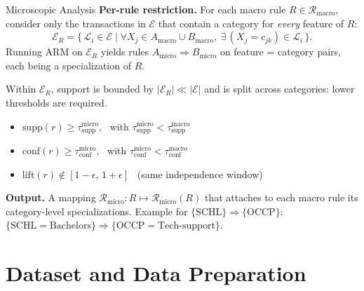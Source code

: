 \documentclass[10pt,aspectratio=169]{beamer}
\begin{document}
\begin{frame}{Microscopic Analysis}
  \textbf{Per-rule restriction.} For each macro rule $R \in \mathcal{R}_{\mathrm{macro}}$, consider only the transactions in $\mathcal{E}$ that contain a category for \emph{every} feature of $R$:
  \begin{equation*}
    \mathcal{E}_R = \{\, \mathcal{L}_i \in \mathcal{E} \mid \forall X_j \in A_{\mathrm{macro}} \cup B_{\mathrm{macro}},\ \exists\, (X_j = c_{jk}) \in \mathcal{L}_i \,\}.
  \end{equation*}
  Running ARM on $\mathcal{E}_R$ yields rules $A_{\mathrm{micro}} \Rightarrow B_{\mathrm{micro}}$ on \textcolor{highlightorange}{feature = category pairs}, each being a specialization of $R$.
  \vspace{4pt}
  
  \begin{tcolorbox}[colback=parthenopeaccent!25,colframe=parthenopenavy,boxrule=0.5pt,arc=1pt,title=\bfseries Filtering thresholds (microscopic)]
    \scriptsize
    Within $\mathcal{E}_R$, support is bounded by $|\mathcal{E}_R| \ll |\mathcal{E}|$ and is split across categories: lower thresholds are required.
    \begin{itemize}\small
      \item $\mathrm{supp}(r) \geq \tau_{\mathrm{supp}}^{\mathrm{micro}}$, \ with $\tau_{\mathrm{supp}}^{\mathrm{micro}} < \tau_{\mathrm{supp}}^{\mathrm{macro}}$
      \item $\mathrm{conf}(r) \geq \tau_{\mathrm{conf}}^{\mathrm{micro}}$, \ with $\tau_{\mathrm{conf}}^{\mathrm{micro}} < \tau_{\mathrm{conf}}^{\mathrm{macro}}$
      \item $\mathrm{lift}(r) \notin [1 - \epsilon,\, 1 + \epsilon]$ \ (same independence window)
    \end{itemize}
  \end{tcolorbox}
  \vspace{2pt}
  \textbf{Output.} A mapping $\mathcal{R}_{\mathrm{micro}} : R \mapsto \mathcal{R}_{\mathrm{micro}}(R)$ that attaches to each macro rule its category-level specializations. Example for $\{\mathrm{SCHL}\} \Rightarrow \{\mathrm{OCCP}\}$:\\
  \quad $\{\mathrm{SCHL{=}Bachelors}\} \Rightarrow \{\mathrm{OCCP{=}Tech\text{-}support}\}$.
\end{frame}

\section{Dataset and Data Preparation}
\end{document}
